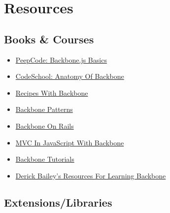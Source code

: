 \documentclass[9pt]{book}
\begin{document}
\section{Resources}\label{resources}

\subsection{Books \& Courses}\label{books-courses}

\begin{itemize}
\itemsep1pt\parskip0pt
\item
  \href{https://peepcode.com/products/backbone-js}{PeepCode: Backbone.js
  Basics}
\item
  \href{http://www.codeschool.com/courses/anatomy-of-backbonejs}{CodeSchool:
  Anatomy Of Backbone}
\item
  \href{http://recipeswithbackbone.com/}{Recipes With Backbone}
\item
  \href{http://ricostacruz.com/backbone-patterns/}{Backbone Patterns}
\item
  \href{https://learn.thoughtbot.com/products/1-backbone-js-on-rails}{Backbone
  On Rails}
\item
  \href{http://www.integralist.co.uk/posts/mvc-in-javascript-with-backbone-js/index.html}{MVC
  In JavaScript With Backbone}
\item
  \href{http://backbonetutorials.com/}{Backbone Tutorials}
\item
  \href{http://lostechies.com/derickbailey/2011/09/13/resources-for-and-how-i-learned-backbone-js/}{Derick
  Bailey's Resources For Learning Backbone}
\end{itemize}

\subsection{Extensions/Libraries}\label{extensionslibraries}
\end{document}
